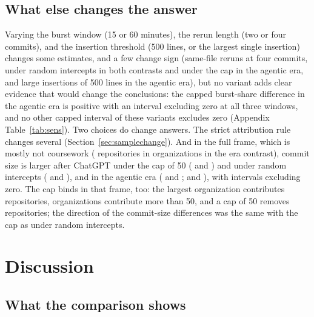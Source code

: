 \documentclass[acmsmall,screen,review,anonymous]{acmart}
\begin{document}
\subsection{What else changes the answer}
\label{sec:robust}

Varying the burst window (15 or 60 minutes), the rerun length (two or four commits), and the insertion threshold (500 lines, or the largest single insertion) changes some estimates, and a few change sign (same-file reruns at four commits, under random intercepts in both contrasts and under the cap in the agentic era, and large insertions of 500 lines in the agentic era), but no variant adds clear evidence that would change the conclusions: the capped burst-share difference in the agentic era is positive with an interval excluding zero at all three windows, and no other capped interval of these variants excludes zero (Appendix Table~\ref{tab:sens}). Two choices do change answers. The strict attribution rule changes several (Section~\ref{sec:samplechange}). And in the full frame, which is mostly not coursework ( repositories in  organizations in the era contrast), commit size is larger after ChatGPT under the cap of 50 ( and ) and under random intercepts ( and ), and in the agentic era ( and ;  and ), with intervals excluding zero. The cap binds in that frame, too: the largest organization contributes  repositories,  organizations contribute more than 50, and a cap of 50 removes  repositories; the direction of the commit-size differences was the same with the cap as under random intercepts.
\section{Discussion}
\label{sec:discussion}

\subsection{What the comparison shows}
\end{document}
